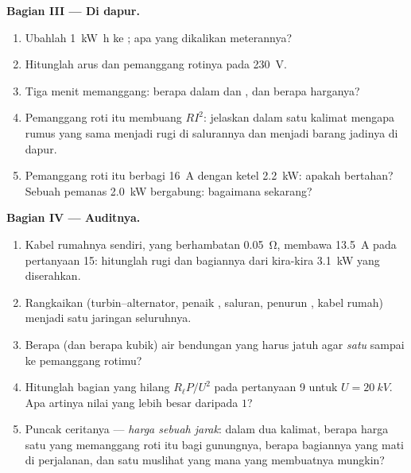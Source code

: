 \begin{problem}
\medskip
\noindent\textbf{Bagian III --- Di dapur.}
\begin{enumerate}[resume]
  \item Ubahlah \qty{1}{kW.h} ke ; apa yang dikalikan meterannya?
  \item Hitunglah arus dan  pemanggang rotinya pada \qty{230}{V}.
  \item Tiga menit memanggang: berapa  dalam  dan
        , dan berapa harganya?
  \item Pemanggang roti itu membuang $RI^2$: jelaskan dalam satu kalimat
        mengapa rumus yang sama menjadi rugi  di salurannya dan
        menjadi barang jadinya di dapur.
  \item Pemanggang roti itu berbagi  \qty{16}{A} dengan ketel
        \qty{2.2}{kW}: apakah  bertahan? Sebuah pemanas
        \qty{2.0}{kW} bergabung: bagaimana sekarang?
\end{enumerate}

\medskip
\noindent\textbf{Bagian IV --- Auditnya.}
\begin{enumerate}[resume]
  \item Kabel rumahnya sendiri, yang berhambatan \qty{0.05}{\ohm},
        membawa \qty{13.5}{A} pada pertanyaan 15: hitunglah rugi 
        dan bagiannya dari kira-kira \qty{3.1}{kW} yang diserahkan.
  \item Rangkaikan  (turbin--alternator, penaik ,
        saluran, penurun , kabel rumah) menjadi satu 
        jaringan seluruhnya.
  \item Berapa  (dan berapa  kubik) air bendungan yang
        harus jatuh agar \emph{satu}  sampai ke pemanggang
        rotimu?
  \item Hitunglah bagian yang hilang $R_\ell P/U^2$ pada pertanyaan 9
        untuk $U = \qty{20}{kV}$. Apa artinya nilai yang lebih besar
        daripada $1$?
  \item Puncak ceritanya --- \emph{harga sebuah jarak}: dalam dua
        kalimat, berapa harga satu  yang memanggang roti itu
        bagi gunungnya, berapa bagiannya yang mati di perjalanan, dan
        satu muslihat yang mana yang membuatnya mungkin?
\end{enumerate}
\end{problem}
